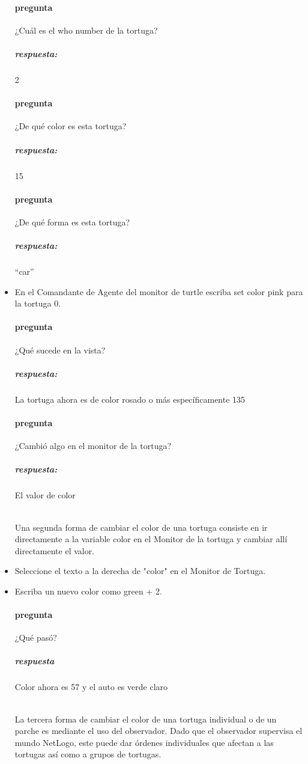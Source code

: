 \documentclass[12pt,letterpaper]{article}
\begin{document}
\begin{itemize}
\paragraph{pregunta}¿Cuál es el who number de la tortuga?
\subparagraph{respuesta:}2
\paragraph{pregunta}¿De qué color es esta tortuga?
\subparagraph{respuesta:}15
\paragraph{pregunta}¿De qué forma es esta tortuga?
\subparagraph{respuesta:}“car”

\item En el Comandante de Agente del monitor de turtle escriba set color pink para la tortuga 0.
\paragraph{pregunta}¿Qué sucede en la vista?
\subparagraph{respuesta:}La tortuga ahora es de color rosado o más específicamente 135
\paragraph{pregunta}¿Cambió algo en el monitor de la tortuga?
\subparagraph{respuesta:}El valor de color

\hfill \\

Una segunda forma de cambiar el color de una tortuga consiste en ir directamente a la variable color en el Monitor de la tortuga y cambiar allí directamente el valor.


\item Seleccione el texto a la derecha de "color" en el Monitor de Tortuga.
\item Escriba un nuevo color como green + 2.

\paragraph{pregunta}¿Qué pasó?
\subparagraph{respuesta}Color ahora es 57 y el auto es verde claro

 \hfill \\

La tercera forma de cambiar el color de una tortuga individual o de un parche es mediante el uso del observador. Dado que el observador supervisa el mundo NetLogo, este puede dar órdenes individuales que afectan a las tortugas así como a grupos de tortugas.


\end{itemize}
\end{document}

